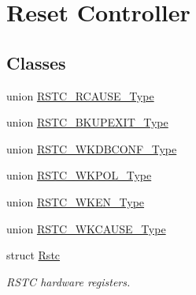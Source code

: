 \hypertarget{group___s_a_m_l21___r_s_t_c}{}\section{Reset Controller}
\label{group___s_a_m_l21___r_s_t_c}
\subsection*{Classes}
\begin{DoxyCompactItemize}
\item 
union \hyperlink{union_r_s_t_c___r_c_a_u_s_e___type}{R\+S\+T\+C\+\_\+\+R\+C\+A\+U\+S\+E\+\_\+\+Type}
\item 
union \hyperlink{union_r_s_t_c___b_k_u_p_e_x_i_t___type}{R\+S\+T\+C\+\_\+\+B\+K\+U\+P\+E\+X\+I\+T\+\_\+\+Type}
\item 
union \hyperlink{union_r_s_t_c___w_k_d_b_c_o_n_f___type}{R\+S\+T\+C\+\_\+\+W\+K\+D\+B\+C\+O\+N\+F\+\_\+\+Type}
\item 
union \hyperlink{union_r_s_t_c___w_k_p_o_l___type}{R\+S\+T\+C\+\_\+\+W\+K\+P\+O\+L\+\_\+\+Type}
\item 
union \hyperlink{union_r_s_t_c___w_k_e_n___type}{R\+S\+T\+C\+\_\+\+W\+K\+E\+N\+\_\+\+Type}
\item 
union \hyperlink{union_r_s_t_c___w_k_c_a_u_s_e___type}{R\+S\+T\+C\+\_\+\+W\+K\+C\+A\+U\+S\+E\+\_\+\+Type}
\item 
struct \hyperlink{struct_rstc}{Rstc}
\begin{DoxyCompactList}\small\item\em R\+S\+T\+C hardware registers. \end{DoxyCompactList}\end{DoxyCompactItemize}
